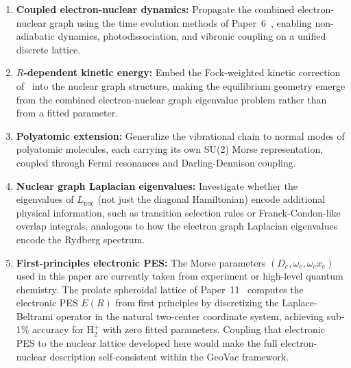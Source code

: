 \documentclass[aps,pra,twocolumn,superscriptaddress,longbibliography]{revtex4-2}
\begin{document}
\begin{enumerate}
\item \textbf{Coupled electron-nuclear dynamics:} Propagate the combined
electron-nuclear graph using the time evolution methods of
Paper~6~\cite{paper6}, enabling non-adiabatic dynamics, photodissociation,
and vibronic coupling on a unified discrete lattice.

\item \textbf{$R$-dependent kinetic energy:} Embed the Fock-weighted
kinetic correction of~\cite{lcao_paper} into the nuclear graph structure,
making the equilibrium geometry emerge from the combined electron-nuclear
graph eigenvalue problem rather than from a fitted parameter.

\item \textbf{Polyatomic extension:} Generalize the vibrational chain
to normal modes of polyatomic molecules, each carrying its own SU(2)
Morse representation, coupled through Fermi resonances and
Darling-Dennison coupling.

\item \textbf{Nuclear graph Laplacian eigenvalues:} Investigate whether
the eigenvalues of $L_{\mathrm{nuc}}$ (not just the diagonal
Hamiltonian) encode additional physical information, such as transition
selection rules or Franck-Condon-like overlap integrals, analogous to
how the electron graph Laplacian eigenvalues encode the Rydberg spectrum.

\item \textbf{First-principles electronic PES:} The Morse parameters
$(D_e, \omega_e, \omega_e x_e)$ used in this paper are currently taken
from experiment or high-level quantum chemistry.  The prolate spheroidal
lattice of Paper~11~\cite{loutey_paper11} computes the electronic PES
$E(R)$ from first principles by discretizing the Laplace-Beltrami
operator in the natural two-center coordinate system, achieving sub-1\%
accuracy for H$_2^+$ with zero fitted parameters.  Coupling that
electronic PES to the nuclear lattice developed here would make the
full electron-nuclear description self-consistent within the GeoVac
framework.
\end{enumerate}


\end{document}
